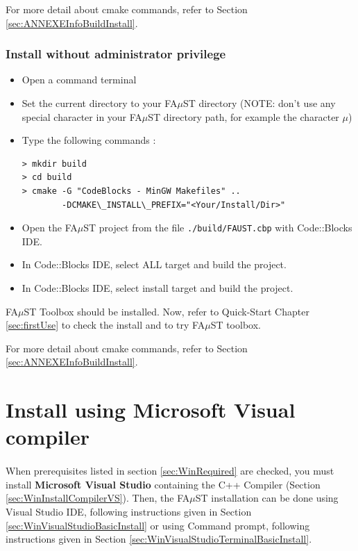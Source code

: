 For more detail about cmake commands, refer to Section \ref{sec:ANNEXEInfoBuildInstall}.

\subsubsection{Install without administrator privilege}
\label{sec:WinMinGWCodeBlocksNoAdminBasicInstall}
\begin{itemize}
\item Open a command terminal
\item Set the current directory to your FA$\mu$ST directory (NOTE: don't use any special character in your FA$\mu$ST directory path, for example the character $\mu$)
\item Type the following commands : 
\begin{lstlisting}
> mkdir build
> cd build
> cmake -G "CodeBlocks - MinGW Makefiles" .. 
	    -DCMAKE\_INSTALL\_PREFIX="<Your/Install/Dir>"
\end{lstlisting}
\item Open the FA$\mu$ST project from the file \texttt{./build/FAUST.cbp} with Code::Blocks IDE.
\item In Code::Blocks IDE, select ALL target and build the project.
\item In Code::Blocks IDE, select install target and build the project.
\end{itemize}

FA$\mu$ST Toolbox should be installed. Now, refer to Quick-Start Chapter \ref{sec:firstUse} to check the install and to try FA$\mu$ST toolbox.

For more detail about cmake commands, refer to Section \ref{sec:ANNEXEInfoBuildInstall}.


\section{Install using Microsoft Visual compiler}\label{sec:WinInstallVS}

\paragraph{}When prerequisites listed in section \ref{sec:WinRequired} are checked, you must install \textbf{Microsoft Visual Studio} containing the C++ Compiler (Section \ref{sec:WinInstallCompilerVS}).
Then, the FA$\mu$ST installation can be done using Visual Studio IDE, following instructions given in Section \ref{sec:WinVisualStudioBasicInstall} or using Command prompt, following instructions given in Section \ref{sec:WinVisualStudioTerminalBasicInstall}. 


